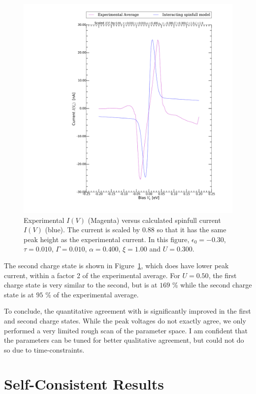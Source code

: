 \begin{figure}[htb]
    \centering
    \includegraphics[width=.95\textwidth, clip=true, trim=11cm 2cm 2cm 0cm]{pdf/fit/fit_spinfull_1.pdf}
    \caption{Experimental $I(V)$ (Magenta) versus calculated spinfull current $I(V)$ (blue). The current is scaled by $0.88$ so that it has the same peak height as the experimental current. In this figure, $\epsilon_0=-0.30$, $\tau=0.010$, $\Gamma=0.010$, $\alpha=0.400$, $\xi=1.00$ and $U=0.300$.
    }
    \label{fig:fitspinfull1}
\end{figure} 

The second charge state is shown in Figure~\ref{fig:fitspinfull1}, which does have lower peak current, within a factor 2 of the experimental average. For $U=0.50$, the first charge state is very similar to the second, but is at $169$ \% while the second charge state is at $95$ \% of the experimental average.

To conclude, the quantitative agreement with \citet{perrinnano} is significantly improved in the first and second charge states. While the peak voltages do not exactly agree, we only performed a very limited rough scan of the parameter space. I am confident that the parameters can be tuned for better qualitative agreement, but could not do so due to time-constraints.

\clearpage\section{Self-Consistent Results}
\label{sec:resultsselfconsistencycalc}

